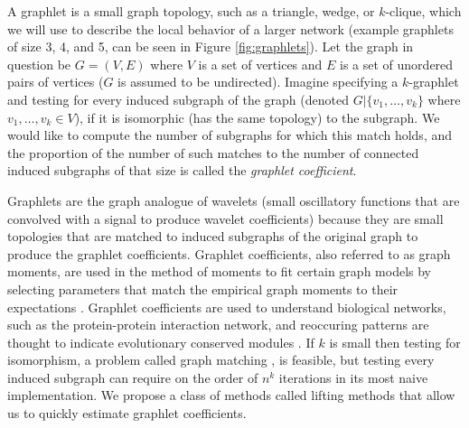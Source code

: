 	A graphlet is a small graph topology, such as a triangle, wedge, or $k$-clique, which we will use to describe the local behavior of a larger network (example graphlets of size 3, 4, and 5, can be seen in Figure \ref{fig:graphlets}).
	Let the graph in question be $G = (V,E)$ where $V$ is a set of vertices and $E$ is a set of unordered pairs of vertices ($G$ is assumed to be undirected).
	Imagine specifying a $k$-graphlet and testing for every induced subgraph of the graph (denoted $G|\{v_1,\ldots,v_k\}$ where $v_1,\ldots,v_k \in V$), if it is isomorphic (has the same topology) to the subgraph.
	We would like to compute the number of subgraphs for which this match holds, and the proportion of the number of such matches to the number of connected induced subgraphs of that size is called the {\em graphlet coefficient}.
	
    Graphlets are the graph analogue of wavelets (small oscillatory functions that are convolved with a signal to produce wavelet coefficients) because they are small topologies that are matched to induced subgraphs of the original graph to produce the graphlet coefficients.
	Graphlet coefficients, also referred to as graph moments, are used in the method of moments to fit certain graph models by selecting parameters that match the empirical graph moments to their expectations \cite{bickel2011method}.
	Graphlet coefficients are used to understand biological networks, such as the protein-protein interaction network, and reoccuring patterns are thought to indicate evolutionary conserved modules \cite{prvzulj2006efficient}. 
	If $k$ is small then testing for isomorphism, a problem called graph matching \cite{cordella2004sub}, is feasible, but testing every induced subgraph can require on the order of $n^k$ iterations in its most naive implementation.
	We propose a class of methods called lifting methods that allow us to quickly estimate graphlet coefficients.

	
